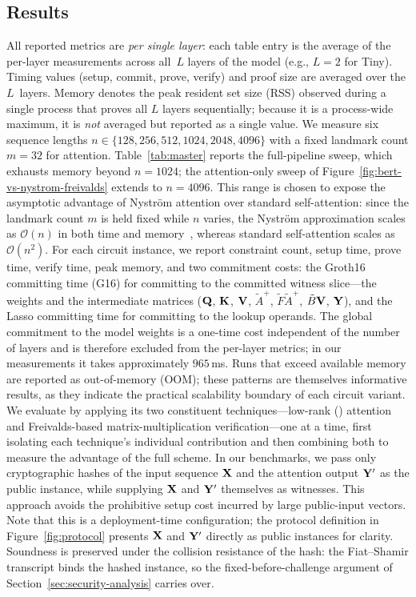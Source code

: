\documentclass[sigconf,anonymous,review,balance=false]{acmart}
\newcommand{\rev}[1]{{\color{magenta}#1}}
\begin{document}
\subsection{Results}
\label{subsec:pipeline-costs}
All reported metrics are \emph{per single layer}: each table entry is the average of the per-layer measurements across all~$L$ layers of the model (e.g., $L{=}2$ for Tiny). Timing values (setup, commit, prove, verify) and proof size are averaged over the $L$~layers. Memory denotes the peak resident set size (RSS) observed during a single process that proves all $L$ layers sequentially; because it is a process-wide maximum, it is \emph{not} averaged but reported as a single value. We measure six sequence lengths $n \in \{128, 256, 512, 1024, 2048, 4096\}$ with a fixed landmark count $m{=}32$ for \nystrom attention. \rev{Table~\ref{tab:master} reports the full-pipeline sweep, which exhausts memory beyond $n{=}1024$; the attention-only sweep of Figure~\ref{fig:bert-vs-nystrom-freivalds} extends to $n{=}4096$.} This range is chosen to expose the asymptotic advantage of Nystr\"om attention over standard self-attention: since the landmark count $m$ is held fixed while $n$ varies, the Nystr\"om approximation scales as $\mathcal{O}(n)$ in both time and memory~\cite{Nystromformer}, whereas standard self-attention scales as $\mathcal{O}(n^2)$. For each circuit instance, we report constraint count, setup time, prove time, verify time, peak memory, and two commitment costs: the Groth16 committing time (G16) \rev{for committing to the committed witness slice---the weights and the intermediate matrices (${\mathbf{Q}}$, ${\mathbf{K}}$, ${\mathbf{V}}$, $\tilde{A}^{+}$, $\tilde{F}\tilde{A}^{+}$, $\tilde{B}{\mathbf{V}}$, ${\mathbf{Y}}$)}, and the Lasso committing time for committing to the lookup operands. The global commitment to the model weights is a one-time cost independent of the number of layers and is therefore excluded from the per-layer metrics; in our measurements it takes approximately $965$\,ms. Runs that exceed available memory are reported as out-of-memory (OOM); these patterns are themselves informative results, as they indicate the practical scalability boundary of each circuit variant. We evaluate \name by applying its two constituent techniques---low-rank (\nystrom) attention and Freivalds-based matrix-multiplication verification---one at a time, first isolating each technique's individual contribution and then combining both to measure the advantage of the full scheme.
In our benchmarks, we pass only cryptographic hashes of the input sequence ${\mathbf{X}}$ and the attention output ${\mathbf{Y}}'$ as the public instance, while supplying ${\mathbf{X}}$ and ${\mathbf{Y}}'$ themselves as witnesses. This approach avoids the prohibitive setup cost incurred by large public-input vectors. Note that this is a deployment-time configuration; the protocol definition in Figure~\ref{fig:protocol} presents ${\mathbf{X}}$ and ${\mathbf{Y}}'$ directly as public instances for clarity. \rev{Soundness is preserved under the collision resistance of the hash: the Fiat--Shamir transcript binds the hashed instance, so the fixed-before-challenge argument of Section~\ref{sec:security-analysis} carries over.}
\end{document}
